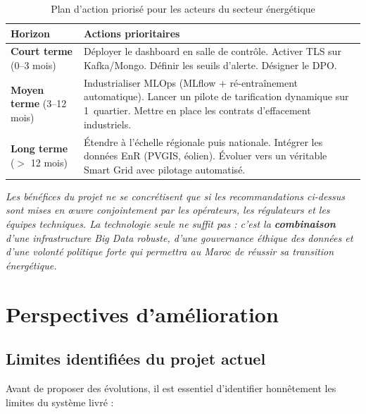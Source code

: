 \documentclass[11pt,a4paper]{article}
\begin{document}
\begin{table}[h!]
\centering
\begin{tabularx}{\textwidth}{lY}
\toprule
{}
\textbf{Horizon} & \textbf{Actions prioritaires} \\
\midrule
\textbf{Court terme} (0--3 mois) &
  Déployer le dashboard en salle de contrôle. Activer TLS sur Kafka/Mongo. Définir les seuils d'alerte. Désigner le DPO. \\
\midrule
\textbf{Moyen terme} (3--12 mois) &
  Industrialiser MLOps (MLflow + ré-entraînement automatique). Lancer un pilote de tarification dynamique sur 1~quartier. Mettre en place les contrats d'effacement industriels. \\
\midrule
\textbf{Long terme} ($>$ 12 mois) &
  Étendre à l'échelle régionale puis nationale. Intégrer les données EnR (PVGIS, éolien). Évoluer vers un véritable Smart Grid avec pilotage automatisé. \\
\bottomrule
\end{tabularx}
\caption{Plan d'action priorisé pour les acteurs du secteur énergétique}
\end{table}

\begin{infobox}[title=Message clé]
\textit{Les bénéfices du projet ne se concrétisent que si les recommandations ci-dessus sont mises en \oe{}uvre conjointement par les opérateurs, les régulateurs et les équipes techniques. La technologie seule ne suffit pas : c'est la \textbf{combinaison} d'une infrastructure Big Data robuste, d'une gouvernance éthique des données et d'une volonté politique forte qui permettra au Maroc de réussir sa transition énergétique.}
\end{infobox}

\newpage

\section{Perspectives d'amélioration}
\label{sec:perspectives}

\subsection{Limites identifiées du projet actuel}

Avant de proposer des évolutions, il est essentiel d'identifier honnêtement les limites du système livré :
\end{document}
